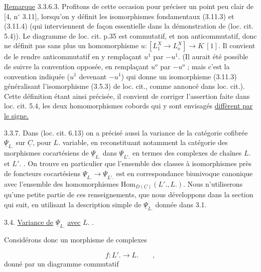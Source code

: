 \underline{Remarque} 3.3.6.3. Profitons de cette occasion pour préciser un point peu clair de [4, n$^{\circ}$ 3.11], lorsqu'on y définit les isomorphismes fondamentaux (3.11.3) et (3.11.4) (qui interviennent de façon essentielle dans la démonstration de (loc. cit. 5.4)). Le diagramme de loc. cit. p.35 est commutatif, et non anticommutatif, donc ne définit pas sans plus un homomorphisme $u : [L_1^X \longrightarrow L_o^X] \longrightarrow K^{\cdot}[1]$. Il convient de le rendre anticommutatif en y remplaçant $u^1$ par $-u^1$. (Il aurait été possible de suivre la convention opposée, en remplaçant $u^o$ par $-u^o$ ; mais c'est la convention indiquée ($u^1$ devenant $-u^1$) qui donne un isomorphisme (3.11.3) généralisant l'isomorphisme (3.5.3) de loc. cit., comme annoncé dans loc. cit.). Cette définition étant ainsi précisée, il convient de corriger l'assertion faite dans loc. cit. 5.4, les deux homomorphismes cobords qui
y sont envisagés \underline{diffèrent par le signe.}

3.3.7. Dans (loc. cit. 6.13) on a précisé aussi la variance de la catégorie cofibrée $\underline{\Psi}_{L.}$ sur $\underline{C}$, pour $L.$ variable, en reconstituant notamment la catégorie des morphismes cocartésiens de $\underline{\Psi}_{L.}$ dans $\underline{\Psi}_{L'.}$ en termes des complexes de chaînes $L.$ et $L'.$ . On trouve en particulier que l'ensemble des classes à isomorphismes près de foncteurs cocartésiens $\underline{\Psi}_{L.} \longrightarrow \underline{\Psi}_{L'.}$ est en correspondance biunivoque canonique avec l'ensemble des homomorphismes $\mathrm{Hom}_{D(\underline{C})}(L'. ,L.)$. Nous n'utiliserons qu'une petite partie de ces renseignements, que nous développons dans la section qui suit, en utilisant la description simple de $\underline{\Psi}_{L.}$ donnée dans 3.1.


3.4. \underline{Variance de} $\underline{\Psi}_{L.}$ \underline{avec} $L.$ .

Considérons donc un morphisme de complexes

\begin{equation}\tag{3.4.1}
f : L'. \longrightarrow L. \qquad ,
\end{equation}
donné par un diagramme commutatif

